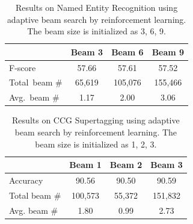 \documentclass[11pt,a4paper]{article}
\begin{document}

\begin{table}
\centering
\caption{Results on Named Entity Recognition using adaptive beam search by reinforcement learning. The beam size is initialized as 3, 6, 9.}
\label{tab:NERRL}
\begin{tabular}{lccc}
\toprule
& Beam 3 & Beam 6 & Beam 9 \\
\midrule
F-score & 57.66 & 57.61 & 57.52 \\
Total~beam \# & 65,619 & 105,076 & 155,466 \\

Avg.~beam \# & 1.17 & 2.00 & 3.06 \\
\bottomrule
\end{tabular}
\end{table}


\begin{table}
\centering
\caption{Results on CCG Supertagging using adaptive beam search by reinforcement learning. The beam size is initialized as 1, 2, 3.}
\label{tab:CCGRL}
\begin{tabular}{lccc}
\toprule
& Beam 1 & Beam 2 & Beam 3 \\
\midrule
Accuracy & 90.56 & 90.50 & 90.59 \\
Total beam \# & 100,573 & 55,372 & 151,832 \\
Avg. beam \# &1.80&0.99& 2.73 \\
\bottomrule
\end{tabular}
\end{table}






\end{document}
